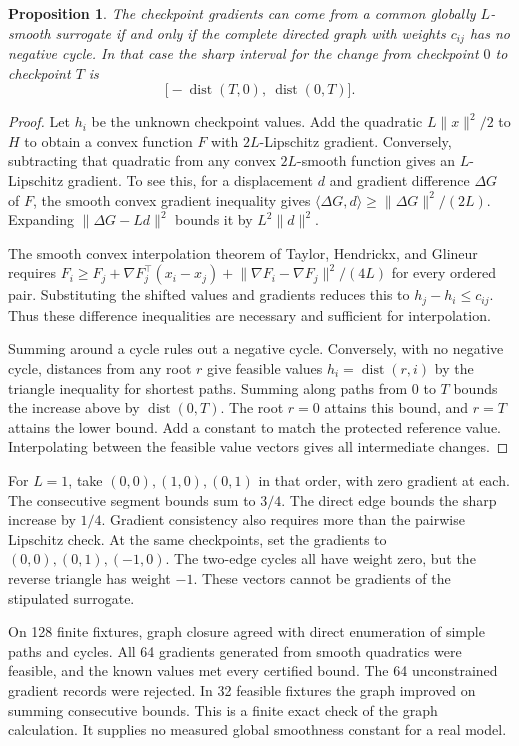\documentclass[11pt]{article}
\newtheorem{proposition}{Proposition}
\begin{document}
\begin{proposition}
The checkpoint gradients can come from a common globally
$L$-smooth surrogate if and only if the complete directed
graph with weights $c_{ij}$ has no negative cycle. In that
case the sharp interval for the change from checkpoint $0$
to checkpoint $T$ is
\[
 \bigl[-\operatorname{dist}(T,0),\ \operatorname{dist}(0,T)\bigr].
\]
\end{proposition}
\begin{proof}
Let $h_i$ be the unknown checkpoint values. Add the quadratic
$L\lVert x\rVert^2/2$ to $H$ to obtain a convex function
$F$ with $2L$-Lipschitz gradient. Conversely, subtracting that
quadratic from any convex $2L$-smooth function gives an
$L$-Lipschitz gradient. To see this, for a displacement $d$
and gradient difference $\Delta G$ of $F$, the smooth convex
gradient inequality gives
$\langle \Delta G,d\rangle\ge\lVert\Delta G\rVert^2/(2L)$.
Expanding $\lVert\Delta G-Ld\rVert^2$ bounds it by
$L^2\lVert d\rVert^2$.

The smooth convex interpolation theorem of Taylor, Hendrickx,
and Glineur \cite{taylor} requires
$F_i\ge F_j+\nabla F_j^\top(x_i-x_j)
 +\lVert\nabla F_i-\nabla F_j\rVert^2/(4L)$ for every
ordered pair. Substituting the shifted values and gradients
reduces this to $h_j-h_i\le c_{ij}$. Thus these difference
inequalities are necessary and sufficient for interpolation.

Summing around a cycle rules out a negative cycle. Conversely,
with no negative cycle, distances from any root $r$ give
feasible values $h_i=\operatorname{dist}(r,i)$ by the
triangle inequality for shortest paths. Summing along paths
from $0$ to $T$ bounds the increase above by
$\operatorname{dist}(0,T)$. The root $r=0$ attains this bound,
and $r=T$ attains the lower bound. Add a constant to match
the protected reference value. Interpolating between the
feasible value vectors gives all intermediate changes.
\end{proof}

For $L=1$, take $(0,0),(1,0),(0,1)$ in that order, with
zero gradient at each. The consecutive segment bounds sum to
$3/4$. The direct edge bounds the sharp increase by $1/4$.
Gradient consistency also requires more than the pairwise
Lipschitz check. At the same checkpoints, set the gradients
to $(0,0),(0,1),(-1,0)$. The two-edge cycles all have
weight zero, but the reverse triangle has weight $-1$.
These vectors cannot be gradients of the stipulated surrogate.

On 128 finite fixtures, graph closure agreed with direct
enumeration of simple paths and cycles. All 64 gradients
generated from smooth quadratics were feasible, and the
known values met every certified bound. The 64 unconstrained
gradient records were rejected. In 32 feasible fixtures the
graph improved on summing consecutive bounds. This is a
finite exact check of the graph calculation. It supplies
no measured global smoothness constant for a real model.
\end{document}
